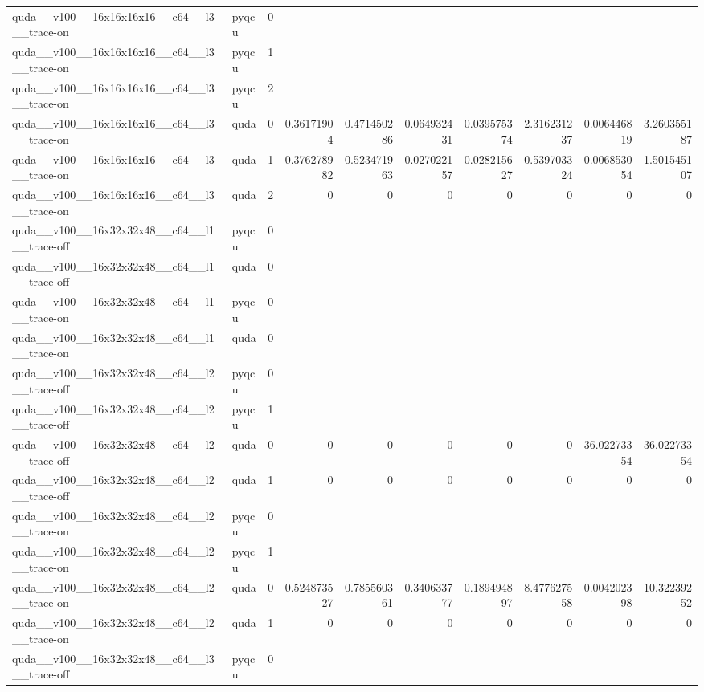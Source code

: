 \begin{table}[htbp]
\begin{tabular}{@{}llrrrrrrrr@{}}
quda\_\_v100\_\_16x16x16x16\_\_c64\_\_l3\_\_trace-on & pyqcu & 0 &  &  &  &  &  &  &  \\
quda\_\_v100\_\_16x16x16x16\_\_c64\_\_l3\_\_trace-on & pyqcu & 1 &  &  &  &  &  &  &  \\
quda\_\_v100\_\_16x16x16x16\_\_c64\_\_l3\_\_trace-on & pyqcu & 2 &  &  &  &  &  &  &  \\
quda\_\_v100\_\_16x16x16x16\_\_c64\_\_l3\_\_trace-on & quda & 0 & 0.36171904 & 0.471450286 & 0.064932431 & 0.039575374 & 2.316231237 & 0.006446819 & 3.260355187 \\
quda\_\_v100\_\_16x16x16x16\_\_c64\_\_l3\_\_trace-on & quda & 1 & 0.376278982 & 0.523471963 & 0.027022157 & 0.028215627 & 0.539703324 & 0.006853054 & 1.501545107 \\
quda\_\_v100\_\_16x16x16x16\_\_c64\_\_l3\_\_trace-on & quda & 2 & 0 & 0 & 0 & 0 & 0 & 0 & 0 \\
quda\_\_v100\_\_16x32x32x48\_\_c64\_\_l1\_\_trace-off & pyqcu & 0 &  &  &  &  &  &  &  \\
quda\_\_v100\_\_16x32x32x48\_\_c64\_\_l1\_\_trace-off & quda & 0 &  &  &  &  &  &  &  \\
quda\_\_v100\_\_16x32x32x48\_\_c64\_\_l1\_\_trace-on & pyqcu & 0 &  &  &  &  &  &  &  \\
quda\_\_v100\_\_16x32x32x48\_\_c64\_\_l1\_\_trace-on & quda & 0 &  &  &  &  &  &  &  \\
quda\_\_v100\_\_16x32x32x48\_\_c64\_\_l2\_\_trace-off & pyqcu & 0 &  &  &  &  &  &  &  \\
quda\_\_v100\_\_16x32x32x48\_\_c64\_\_l2\_\_trace-off & pyqcu & 1 &  &  &  &  &  &  &  \\
quda\_\_v100\_\_16x32x32x48\_\_c64\_\_l2\_\_trace-off & quda & 0 & 0 & 0 & 0 & 0 & 0 & 36.02273354 & 36.02273354 \\
quda\_\_v100\_\_16x32x32x48\_\_c64\_\_l2\_\_trace-off & quda & 1 & 0 & 0 & 0 & 0 & 0 & 0 & 0 \\
quda\_\_v100\_\_16x32x32x48\_\_c64\_\_l2\_\_trace-on & pyqcu & 0 &  &  &  &  &  &  &  \\
quda\_\_v100\_\_16x32x32x48\_\_c64\_\_l2\_\_trace-on & pyqcu & 1 &  &  &  &  &  &  &  \\
quda\_\_v100\_\_16x32x32x48\_\_c64\_\_l2\_\_trace-on & quda & 0 & 0.524873527 & 0.785560361 & 0.340633777 & 0.189494897 & 8.477627558 & 0.004202398 & 10.32239252 \\
quda\_\_v100\_\_16x32x32x48\_\_c64\_\_l2\_\_trace-on & quda & 1 & 0 & 0 & 0 & 0 & 0 & 0 & 0 \\
quda\_\_v100\_\_16x32x32x48\_\_c64\_\_l3\_\_trace-off & pyqcu & 0 &  &  &  &  &  &  &  \\

\end{tabular}
\end{table}
